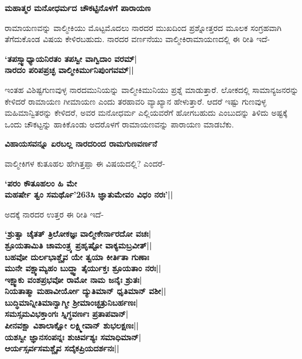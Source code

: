 {\bf ಮಹಾತ್ಮರ ಮನೋಧರ್ಮದ ಚೌಕಟ್ಟಿನೊಳಗೆ ಪಾರಾಯಣ} 


ರಾಮಾಯಣವನ್ನು ವಾಲ್ಮೀಕಿಯು ಮೊಟ್ಟಮೊದಲು ನಾರದರ ಮುಖದಿಂದ ಪ್ರಶ್ನೋತ್ತರದ ಮೂಲಕ ಸಂಗ್ರಹವಾಗಿ ತೆಗೆದುಕೊಂಡ ವಿಷಯ ಕೇಳಿರಬಹುದು. ನಾರದರ ವರ್ಣನೆಯು ವಾಲ್ಮೀಕಿರಾಮಾಯಣದಲ್ಲಿ ಈ ರೀತಿ ಇದೆ- 


\begin{center} 

{\bf `ತಪಸ್ಸ್ವಾಧ್ಯಾಯನಿರತಂ ತಪಸ್ವೀ ವಾಗ್ವಿದಾಂ ವರಮ್‍|\\ 

ನಾರದಂ ಪರಿಪಪ್ರಚ್ಛ ವಾಲ್ಮೀಕಿರ್ಮುನಿಪುಂಗವಮ್‍||} 

\end{center} 


ಇಂತಹ ವಿಶಿಷ್ಟಗುಣವುಳ್ಳ ನಾರದಮುನಿಯನ್ನು ವಾಲ್ಮೀಕಿಮುನಿಯು ಪ್ರಶ್ನೆ ಮಾಡುತ್ತಾರೆ. ಲೋಕದಲ್ಲಿ ಸಾಮಾನ್ಯಜನರನ್ನು ಕೇಳಿದರೆ ರಾಮಾಯಣ ಗೀಮಾಯಣ ಎಂದು ತರಹಾವರಿ ವ್ಯಾಖ್ಯಾನ ಹೇಳುತ್ತಾರೆ. ಆದರೆ ಇಷ್ಟು ಗುಣವುಳ್ಳ ಮಹಿಮಾನ್ವಿತರನ್ನು ಕೇಳಿದರೆ, ಅವರ ಮನೋಧರ್ಮ ಎಲ್ಲಿಯವರೆಗೆ ಹೋಗಬಹುದು ಎಂಬುದನ್ನು ತಿಳಿದು ಅಷ್ಟಕ್ಕೆ ಒಂದು ಚೌಕಟ್ಟನ್ನು ಹಾಕಿಕೊಂಡು ಅದರೊಳಗೆ ರಾಮಾಯಣವನ್ನು ಪಾರಾಯಣ ಮಾಡಬೆಕು. 


{\bf ವಿಹಾಯಸವನ್ನೂ ಏರಬಲ್ಲ ನಾರದರಿಂದ ರಾಮಗುಣವರ್ಣನೆ} 


ವಾಲ್ಮೀಕಿಗಳ ಕುತೂಹಲ ಹೇಗಿತ್ತಪ್ಪಾ ಈ ವಿಷಯದಲ್ಲಿ? ಎಂದರೆ- 


\begin{center} 

{\bf `ಪರಂ ಕೌತೂಹಲಂ ಹಿ ಮೇ\\ 

ಮಹರ್ಷೇ ತ್ವಂ ಸಮರ್ಥೊ\char'263ಸಿ ಜ್ಞಾತುಮೇವಂ ವಿಧಂ ನರಃ'||} 

\end{center} 


ಅದಕ್ಕೆ ನಾರದರ ಉತ್ತರ ಈ ರೀತಿ ಇದೆ- 


\begin{center} 

{\bf `ಶ್ರುತ್ವಾ ಚೈತತ್‍ ತ್ರಿಲೋಕಜ್ಞಃ ವಾಲ್ಮೀಕೇರ್ನಾರದೋ ವಚಃ|\\ 

ಶ್ರೂಯತಾಮಿತಿ ಚಾಮಂತ್ರ್ಯ ಪ್ರಹೃಷ್ಟೋ ವಾಕ್ಯಮಬ್ರವೀತ್‍||\\ 

ಬಹವೋ ದುರ್ಲಭಾಶ್ಚೈವ ಯೇ ತ್ವಯಾ ಕೀರ್ತಿತಾ ಗುಣಾಃ\\ 

ಮುನೇ ವಕ್ಷ್ಯಾಮ್ಯಹಂ ಬುದ್ಧ್ವಾ ತೈರ್ಯುಕ್ತಃ ಶ್ರೂಯತಾಂ ನರಃ||\\ 

ಇಕ್ಷ್ವಾಕು ವಂಶಪ್ರಭವೋ ರಾಮೋ ನಾಮ ಜನೈಃ ಶ್ರುತಃ|\\ 

ನಿಯತಾತ್ಮಾ ಮಹಾವೀರ್ಯೋ ದ್ಯುತಿಮಾನ್‍ ಧೃತಿಮಾನ್‍ ವಶೀ||\\ 

ಬುದ್ಧಿಮಾನ್ನೀತಿಮಾನ್ವಾಗ್ಮೀ ಶ್ರೀಮಾಂಚ್ಛತ್ರುನಿಬರ್ಹಣಃ|\\ 

ಸಮಸ್ಸಮವಿಭಕ್ತಾಂಗಃ ಸ್ನಿಗ್ಧವರ್ಣಃ ಪ್ರತಾಪವಾನ್‍|\\ 

ಪೀನವಕ್ಷಾ ವಿಶಾಲಾಕ್ಷೋ ಲಕ್ಷ್ಮೀವಾನ್‍ ಶುಭಲಕ್ಷಣಃ||\\ 

ಯಶಸ್ವೀ ಜ್ಞಾನಸಂಪನ್ನಃ ಶುಚಿರ್ವಶ್ಯಃ ಸಮಾಧಿಮಾನ್‍|\\ 

ಆರ್ಯಸ್ಸರ್ವಸಮಶ್ಚೈವ ಸದೈಕಪ್ರಿಯದರ್ಶನಃ||} 

\end{center} 


